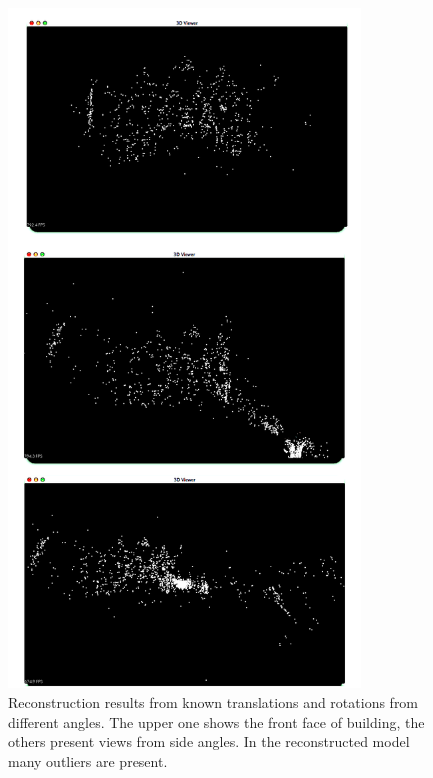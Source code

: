 \begin{figure}[p]
    \centering
    \includegraphics[height=18cm]{uniNone4000}
    \caption[Reconstruction results from known translations and rotations from different angles]{Reconstruction results from known translations and rotations from different angles. The upper one shows the front face of building, the others present views from side angles. In the reconstructed model many outliers are present.}
    \label{fig:UniNone4000}
\end{figure}

